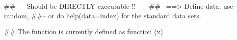 %
\begin{Examples}
\begin{ExampleCode}
##---- Should be DIRECTLY executable !! ----
##-- ==>  Define data, use random,
##--	or do  help(data=index)  for the standard data sets.

## The function is currently defined as
function (x) 
{
  }
\end{ExampleCode}
\end{Examples}
